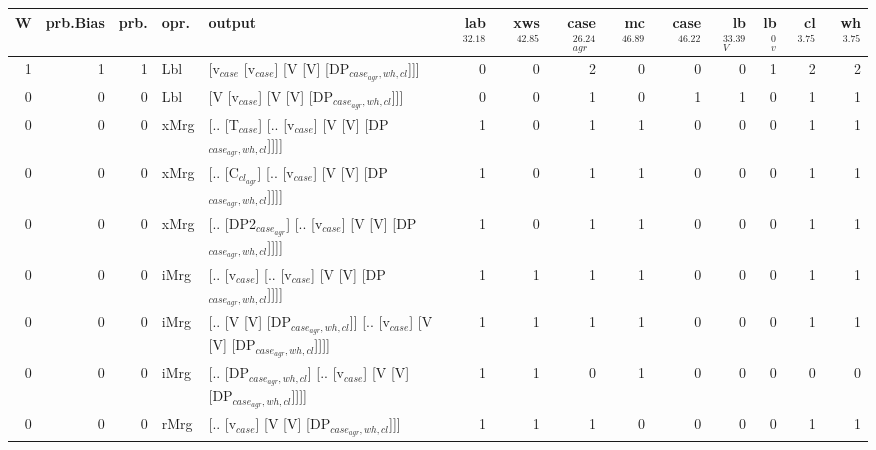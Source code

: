 \begin{tabularx}{\linewidth}{rrrlXrrrrrrrrr}
\hline
   W &   prb.Bias &   prb. & opr.   & output                                                                     &   lab$^{32.18}$ &   xws$^{42.85}$ &   case$_{agr}^{26.24}$ &   mc$^{46.89}$ &   case$^{46.22}$ &   lb$_{V}^{33.39}$ &   lb$_{v}^{0}$ &   cl$^{3.75}$ &   wh$^{3.75}$ \\
\hline
   1 &       1 &   1 & Lbl  & [v$_{case}$ [v$_{case}$] [V [V] [DP$_{case_{agr},wh,cl}$]]]                              &             0 &             0 &                  2 &            0 &              0 &              0 &             1 &        2 &        2 \\
   0 &       0 &   0 & Lbl  & [V [v$_{case}$] [V [V] [DP$_{case_{agr},wh,cl}$]]]                                   &             0 &             0 &                  1 &            0 &              1 &              1 &             0 &        1 &        1 \\
   0 &       0 &   0 & xMrg & [.. [T$_{case}$] [.. [v$_{case}$] [V [V] [DP$_{case_{agr},wh,cl}$]]]]                    &             1 &             0 &                  1 &            1 &              0 &              0 &             0 &        1 &        1 \\
   0 &       0 &   0 & xMrg & [.. [C$_{cl_{agr}}$] [.. [v$_{case}$] [V [V] [DP$_{case_{agr},wh,cl}$]]]]                  &             1 &             0 &                  1 &            1 &              0 &              0 &             0 &        1 &        1 \\
   0 &       0 &   0 & xMrg & [.. [DP2$_{case_{agr}}$] [.. [v$_{case}$] [V [V] [DP$_{case_{agr},wh,cl}$]]]]              &             1 &             0 &                  1 &            1 &              0 &              0 &             0 &        1 &        1 \\
   0 &       0 &   0 & iMrg & [.. [v$_{case}$] [.. [v$_{case}$] [V [V] [DP$_{case_{agr},wh,cl}$]]]]                    &             1 &             1 &                  1 &            1 &              0 &              0 &             0 &        1 &        1 \\
   0 &       0 &   0 & iMrg & [.. [V [V] [DP$_{case_{agr},wh,cl}$]] [.. [v$_{case}$] [V [V] [DP$_{case_{agr},wh,cl}$]]]] &             1 &             1 &                  1 &            1 &              0 &              0 &             0 &        1 &        1 \\
   0 &       0 &   0 & iMrg & [.. [DP$_{case_{agr},wh,cl}$] [.. [v$_{case}$] [V [V] [DP$_{case_{agr},wh,cl}$]]]]         &             1 &             1 &                  0 &            1 &              0 &              0 &             0 &        0 &        0 \\
   0 &       0 &   0 & rMrg & [.. [v$_{case}$] [V [V] [DP$_{case_{agr},wh,cl}$]]]                                  &             1 &             1 &                  1 &            0 &              0 &              0 &             0 &        1 &        1 \\
\hline
\end{tabularx}\endgroup\\
